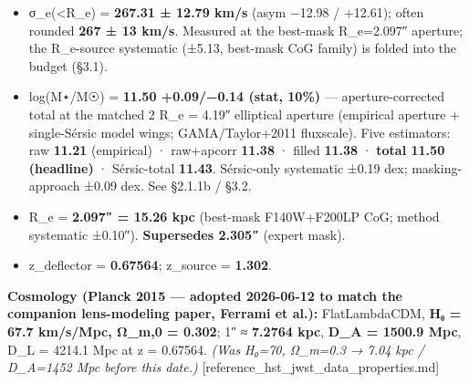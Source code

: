 \documentclass[
]{article}
\providecommand{\tightlist}{%
  \setlength{\itemsep}{0pt}\setlength{\parskip}{0pt}}
\begin{document}
\begin{itemize}
\tightlist
\item
  σ\_e(\textless R\_e) = \textbf{267.31 ± 12.79 km/s} (asym −12.98 /
  +12.61); often rounded \textbf{267 ± 13 km/s}. Measured at the
  best-mask R\_e=2.097″ aperture; the R\_e-source systematic (±5.13,
  best-mask CoG family) is folded into the budget (§3.1).
\item
  log(M⋆/M☉) = \textbf{11.50 +0.09/−0.14 (stat, 10\%)} ---
  aperture-corrected total at the matched 2 R\_e = 4.19″ elliptical
  aperture (empirical aperture + single-Sérsic model wings;
  GAMA/Taylor+2011 fluxscale). Five estimators: raw \textbf{11.21}
  (empirical) · raw+apcorr \textbf{11.38} · filled \textbf{11.38} ·
  \textbf{total 11.50 (headline)} · Sérsic-total \textbf{11.43}.
  Sérsic-only systematic ±0.19 dex; masking-approach ±0.09 dex. See
  §2.1.1b / §3.2.
\item
  R\_e = \textbf{2.097″ = 15.26 kpc} (best-mask F140W+F200LP CoG; method
  systematic ±0.10″). \textbf{Supersedes 2.305″} (expert mask).
\item
  z\_deflector = \textbf{0.67564}; z\_source = \textbf{1.302}.
\end{itemize}

\textbf{Cosmology (Planck 2015 --- adopted 2026-06-12 to match the
companion lens-modeling paper, Ferrami et al.):} FlatLambdaCDM,
\textbf{H₀ = 67.7 km/s/Mpc, Ω\_m,0 = 0.302}; 1″ ≈ \textbf{7.2764 kpc},
\textbf{D\_A = 1500.9 Mpc}, D\_L = 4214.1 Mpc at z = 0.67564. \emph{(Was
H₀=70, Ω\_m=0.3 → 7.04 kpc / D\_A=1452 Mpc before this date.)}
{[}reference\_hst\_jwst\_data\_properties.md{]}
\end{document}
